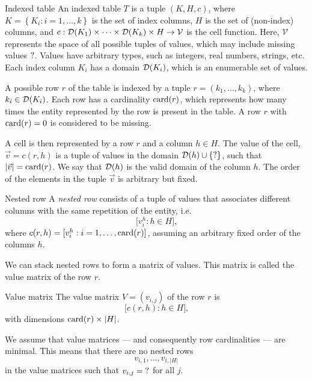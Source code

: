 \begin{definition}{Indexed table}\label{def:itable}
An indexed table $T$ is a tuple $(K, H, c)$, where $K = \left\{K_i : i = 1, \dots,
k\right\}$ is the set of index columns, $H$ is the set of (non-index) columns, and $c :
\domainof{K_1} \times \dots \times \domainof{K_k} \times H \to \mathcal{V}$ is the cell function.
Here, $\mathcal{V}$ represents the space of all possible tuples of values, which
may include missing values $\missing$.  Values have arbitrary types, such as integers,
real numbers, strings, etc.
Each index column $K_i$ has a domain $\domainof{K_i}$, which is an enumerable set of
values.
\end{definition}

A possible row $r$ of the table is indexed by a tuple $r = (k_1, \dots,
k_k)$, where $k_i \in \domainof{K_i}$.  Each row has a cardinality $\rowcard[r]$, which
represents how many times the entity represented by the row is present in the table.
A row $r$ with $\rowcard[r] = 0$ is considered to be missing.

A cell is then represented by a row $r$ and a column $h \in H$.  The value of the cell,
$\vec{v} = c(r, h)$ is a tuple of values in the domain $\domainof{h} \cup \{\missing\}$,
such that $|\vec{v}| = \rowcard[r]$.  We say that $\domainof{h}$ is the valid domain of
the column $h$.
The order of the elements in the tuple $\vec{v}$ is arbitrary but fixed.

\begin{definition}{Nested row}\label{nested-row}
A \emph{nested
row} consists of a tuple of values that associates different columns with the same
repetition of the entity, i.e. \[
  \Big[ v^h_i : h \in H \Big]\text{,}
\]
where $c(r, h) = [v^h_i : i = 1, \dots, \rowcard[r]]$, assuming an arbitrary fixed order
of the columns $h$.
\end{definition}

We can stack nested rows to form a matrix of values.  This matrix is called the value
matrix of the row $r$.

\begin{definition}{Value matrix}\label{def:vmatrix}
The value matrix $V = (v_{i, j})$ of the row $r$ is \[
  \Big[ c(r, h) : h \in H \Big]\text{,}
\] with dimensions $\rowcard[r] \times |H|$.
\end{definition}

We assume that value matrices --- and consequently row cardinalities --- are minimal. This
means that there are no nested rows $$v_{i, 1}, \dots, v_{i, |H|}$$ in the value matrices
such that $v_{i, j} = \missing$ for all $j$.

